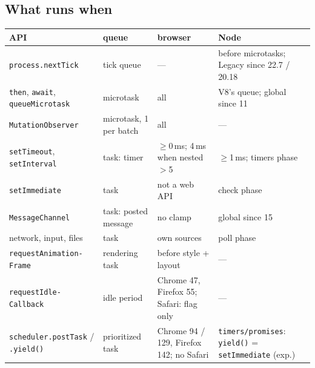 \documentclass[8pt]{extarticle}
\newcommand\ct[1]{\texttt{#1}}
\begin{document}
\begin{multicols}{2}
\raggedright
\footnotesize{}

\section{What runs when}
{\scriptsize\setlength{\tabcolsep}{2pt}
\begin{tabular}{@{}L{19mm}L{15mm}L{21mm}L{21mm}@{}}
\toprule
\textbf{API} & \textbf{queue} & \textbf{browser} & \textbf{Node}\\
\midrule
\ct{process.nextTick} & tick queue & — & before microtasks; Legacy since 22.7 / 20.18\\
\ct{then}, \ct{await}, \ct{queueMicrotask} & microtask & all & V8's queue; global since 11\\
\ct{MutationObserver} & microtask, 1 per batch & all & —\\
\ct{setTimeout}, \ct{setInterval} & task: timer & $\geq$0\,ms; 4\,ms when nested $>$5 & $\geq$1\,ms; timers phase\\
\ct{setImmediate} & task & not a web API & check phase\\
\ct{MessageChannel} & task: posted message & no clamp & global since 15\\
network, input, files & task & own sources & poll phase\\
\ct{requestAnimation-} \ct{Frame} & rendering task & before style + layout & —\\
\ct{requestIdle-} \ct{Callback} & idle period & Chrome 47, Firefox 55; Safari: flag only & —\\
\ct{scheduler.postTask} / \ct{.yield()} & prioritized task & Chrome 94 / 129, Firefox 142; no Safari & \ct{timers/promises}: \ct{yield()} = \ct{setImmediate} (exp.)\\
\bottomrule
\end{tabular}}


\end{multicols}
\end{document}
